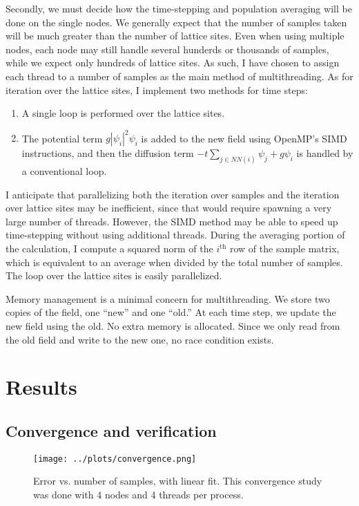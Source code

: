 \documentclass{article}
\begin{document}
Secondly, we must decide how the time-stepping and population averaging will be done on the single nodes. 
We generally expect that the number of samples taken will be much greater than the number of lattice sites.
Even when using multiple nodes, each node may still handle several hunderds or thousands of samples, 
while we expect only hundreds of lattice sites. As such, I have chosen to assign each thread to a number of samples as
the main method of multithreading. As for iteration over the lattice sites, I implement two methods for time steps:
\begin{enumerate}
    \item A single loop is performed over the lattice sites.
    \item The potential term \(g |\psi_i|^2 \psi_i\) is added to the new field using OpenMP's SIMD instructions, 
    and then the diffusion term \(-t \sum_{j \in NN(i)} \psi_j + g \psi_i\) is handled by a conventional loop.
\end{enumerate}
I anticipate that parallelizing both the iteration over samples and the iteration over lattice sites may be inefficient, 
since that would require spawning a very large number of threads. However, the SIMD method may be able to speed up
time-stepping without using additional threads. During the averaging portion of the calculation, I compute a squared norm of 
the \(i^\textrm{th}\) row of the sample matrix, which is equivalent to an average when divided by the 
total number of samples. The loop over the lattice sites is easily parallelized.

Memory management is a minimal concern for multithreading. We store two copies of the field, one ``new'' and one ``old.''
At each time step, we update the new field using the old. No extra memory is allocated. Since we only read from the 
old field and write to the new one, no race condition exists. 

\section{Results} \label{results}

\subsection{Convergence and verification}

\begin{figure}
    \centering
    \texttt{[image: ../plots/convergence.png]}
    \caption{Error vs. number of samples, with linear fit. This convergence study was done with 
    4 nodes and 4 threads per process.}
    \label{fig:convergence}
\end{figure}
\end{document}
